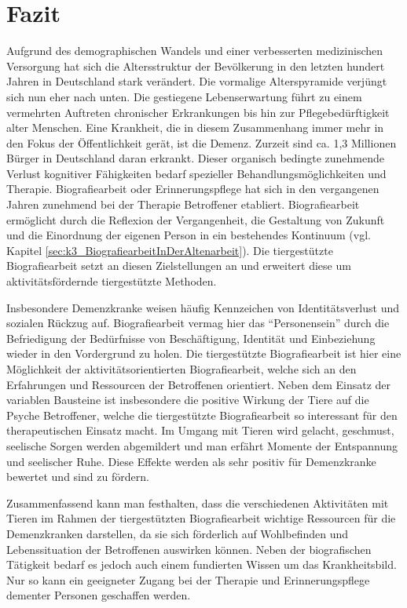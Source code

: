 \section{Fazit}
\label{sec:k5_Fazit}

Aufgrund des demographischen Wandels und einer verbesserten medizinischen Versorgung hat sich die Altersstruktur der Bevölkerung in den letzten hundert Jahren in Deutschland stark verändert. Die vormalige Alterspyramide verjüngt sich nun eher nach unten. Die gestiegene Lebenserwartung führt zu einem vermehrten Auftreten chronischer Erkrankungen bis hin zur Pflegebedürftigkeit alter Menschen. Eine Krankheit, die in diesem Zusammenhang immer mehr in den Fokus der Öffentlichkeit gerät, ist die Demenz. Zurzeit sind ca. 1,3 Millionen Bürger in Deutschland daran erkrankt. Dieser organisch bedingte zunehmende Verlust kognitiver Fähigkeiten bedarf spezieller Behandlungsmöglichkeiten und Therapie. Biografiearbeit oder Erinnerungspflege hat sich in den vergangenen Jahren zunehmend bei der Therapie Betroffener etabliert. Biografiearbeit ermöglicht durch die Reflexion der Vergangenheit, die Gestaltung von Zukunft und die Einordnung der eigenen Person in ein bestehendes Kontinuum (vgl. Kapitel \ref{sec:k3_BiografiearbeitInDerAltenarbeit}). Die tiergestützte Biografiearbeit setzt an diesen Zielstellungen an und erweitert diese um aktivitätsfördernde tiergestützte Methoden.

Insbesondere Demenzkranke weisen häufig Kennzeichen von Identitätsverlust und sozialen Rückzug auf. Biografiearbeit vermag hier das "`Personensein"' durch die Befriedigung der Bedürfnisse von Beschäftigung, Identität und Einbeziehung wieder in den Vordergrund zu holen. Die tiergestützte Biografiearbeit ist hier eine Möglichkeit der aktivitätsorientierten Biografiearbeit, welche sich an den Erfahrungen und Ressourcen der Betroffenen orientiert. Neben dem Einsatz der variablen Bausteine ist insbesondere die positive Wirkung der Tiere auf die Psyche Betroffener, welche die tiergestützte Biografiearbeit so interessant für den therapeutischen Einsatz macht. Im Umgang mit Tieren wird gelacht, geschmust, seelische Sorgen werden abgemildert und man erfährt Momente der Entspannung und seelischer Ruhe. Diese Effekte werden als sehr positiv für Demenzkranke bewertet und sind zu fördern. 

Zusammenfassend kann man festhalten, dass die verschiedenen Aktivitäten mit Tieren im Rahmen der tiergestützten Biografiearbeit wichtige Ressourcen für die Demenzkranken darstellen, da sie sich förderlich auf Wohlbefinden und Lebenssituation der Betroffenen auswirken können. Neben der biografischen Tätigkeit bedarf es jedoch auch einem fundierten Wissen um das Krankheitsbild. Nur so kann ein geeigneter Zugang bei der Therapie und Erinnerungspflege dementer Personen geschaffen werden.

